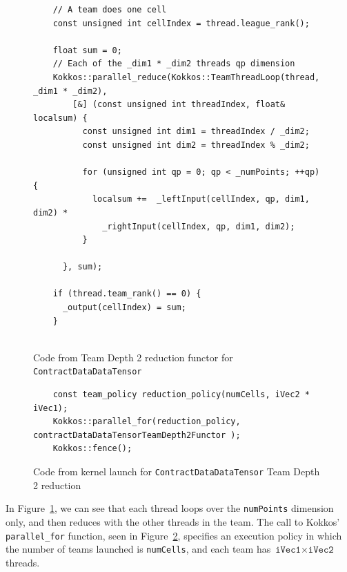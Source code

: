 \begin{figure}[ht]
    \begin{lstlisting}
    // A team does one cell
    const unsigned int cellIndex = thread.league_rank();

    float sum = 0;
    // Each of the _dim1 * _dim2 threads qp dimension
    Kokkos::parallel_reduce(Kokkos::TeamThreadLoop(thread, _dim1 * _dim2),
        [&] (const unsigned int threadIndex, float& localsum) {
          const unsigned int dim1 = threadIndex / _dim2;
          const unsigned int dim2 = threadIndex % _dim2;

          for (unsigned int qp = 0; qp < _numPoints; ++qp) {
            localsum +=  _leftInput(cellIndex, qp, dim1, dim2) *
              _rightInput(cellIndex, qp, dim1, dim2);
          }

      }, sum);

    if (thread.team_rank() == 0) {
      _output(cellIndex) = sum;
    }
    
 \end{lstlisting}
\caption{Code from Team Depth 2 reduction functor for \texttt{ContractDataDataTensor}
\label{lst:ContractDataDataTensorDepth2Functor}} 
\end{figure}

\begin{figure}[ht]
    \begin{lstlisting}
    const team_policy reduction_policy(numCells, iVec2 * iVec1);
    Kokkos::parallel_for(reduction_policy, contractDataDataTensorTeamDepth2Functor );
    Kokkos::fence();
 \end{lstlisting}
\caption{Code from kernel launch for \texttt{ContractDataDataTensor} Team Depth
2 reduction
\label{lst:ContractDataDataTensorDepth2Call}} 
\end{figure}

In Figure~\ref{lst:ContractDataDataTensorDepth2Functor}, we can see that each
thread loops over the \texttt{numPoints} dimension only, and then
reduces with the other threads in the team.  The call to Kokkos'
\texttt{parallel\_for} function, seen in
Figure~\ref{lst:ContractDataDataTensorDepth2Call}, specifies an execution policy
in which the number of teams launched is \texttt{numCells}, and each team has
$\texttt{iVec1}\times\texttt{iVec2}$ threads.

